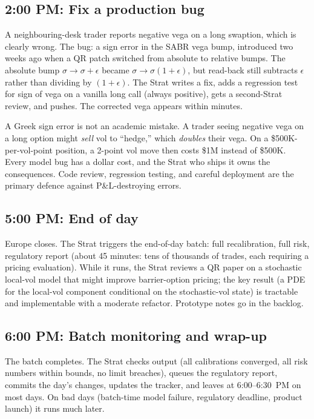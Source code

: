 \subsection{2:00 PM: Fix a production bug}

A neighbouring-desk trader reports negative vega on a long
swaption, which is clearly wrong.  The bug: a sign error in the SABR vega
bump, introduced two weeks ago when a QR patch switched from
absolute to relative bumps.  The absolute bump $\sigma \to \sigma +
\epsilon$ became $\sigma \to \sigma(1 + \epsilon)$, but read-back
still subtracts $\epsilon$ rather than dividing by $(1 + \epsilon)$.
The Strat writes a fix, adds a regression test for sign of vega on
a vanilla long call (always positive), gets a second-Strat review,
and pushes.  The corrected vega appears within minutes.

\begin{pitfallbox}
A Greek sign error is not an academic mistake.  A trader seeing
negative vega on a long option might \emph{sell} vol to ``hedge,''
which \emph{doubles} their vega.  On a \$500K-per-vol-point
position, a 2-point vol move then costs \$1M instead of \$500K.
Every model bug has a dollar cost, and the Strat who ships it owns
the consequences.  Code review, regression testing, and careful
deployment are the primary defence against P\&L-destroying errors.
\end{pitfallbox}

\subsection{5:00 PM: End of day}

Europe closes.  The Strat triggers the end-of-day batch: full recalibration, full
risk, regulatory report (about 45 minutes: tens of thousands of
trades, each requiring a pricing evaluation).  While it runs, the
Strat reviews a QR paper on a stochastic local-vol model that
might improve barrier-option pricing; the key result (a PDE for
the local-vol component conditional on the stochastic-vol state)
is tractable and implementable with a moderate refactor.
Prototype notes go in the backlog.

\subsection{6:00 PM: Batch monitoring and wrap-up}

The batch completes.  The Strat checks output (all calibrations
converged, all risk numbers within bounds, no limit breaches),
queues the regulatory report, commits the day's changes, updates
the tracker, and leaves at 6:00--6:30~PM on most days.  On bad days
(batch-time model failure, regulatory deadline, product launch) it
runs much later.

